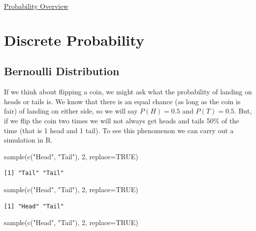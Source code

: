\documentclass[
  letterpaper,
  DIV=11,
  numbers=noendperiod]{scrreprt}
\newenvironment{Shaded}{\begin{snugshade}}{\end{snugshade}}
\newcommand{\AttributeTok}[1]{\textcolor[rgb]{0.40,0.45,0.13}{#1}}
\newcommand{\ConstantTok}[1]{\textcolor[rgb]{0.56,0.35,0.01}{#1}}
\newcommand{\DecValTok}[1]{\textcolor[rgb]{0.68,0.00,0.00}{#1}}
\newcommand{\FunctionTok}[1]{\textcolor[rgb]{0.28,0.35,0.67}{#1}}
\newcommand{\NormalTok}[1]{\textcolor[rgb]{0.00,0.23,0.31}{#1}}
\newcommand{\StringTok}[1]{\textcolor[rgb]{0.13,0.47,0.30}{#1}}
\begin{document}
\begin{watch}{}{}
    \href{https://youtu.be/BxHJLWyJWZo}{Probability Overview}
\end{watch}

\section{Discrete Probability}\label{discrete-probability}

\subsection{Bernoulli Distribution}\label{bernoulli-distribution}

If we think about flipping a coin, we might ask what the probability of
landing on heads or tails is. We know that there is an equal chance (as
long as the coin is fair) of landing on either side, so we will say
\(P(H)=0.5\) and \(P(T)=0.5\). But, if we flip the coin two times we
will not always get heads and tails 50\% of the time (that is 1 head and
1 tail). To see this phenomenon we can carry out a simulation in R.

\begin{Shaded}
\begin{Highlighting}[]
\FunctionTok{sample}\NormalTok{(}\FunctionTok{c}\NormalTok{(}\StringTok{"Head"}\NormalTok{, }\StringTok{"Tail"}\NormalTok{), }\DecValTok{2}\NormalTok{, }\AttributeTok{replace=}\ConstantTok{TRUE}\NormalTok{)}
\end{Highlighting}
\end{Shaded}

\begin{verbatim}
[1] "Tail" "Tail"
\end{verbatim}

\begin{Shaded}
\begin{Highlighting}[]
\FunctionTok{sample}\NormalTok{(}\FunctionTok{c}\NormalTok{(}\StringTok{"Head"}\NormalTok{, }\StringTok{"Tail"}\NormalTok{), }\DecValTok{2}\NormalTok{, }\AttributeTok{replace=}\ConstantTok{TRUE}\NormalTok{)}
\end{Highlighting}
\end{Shaded}

\begin{verbatim}
[1] "Head" "Tail"
\end{verbatim}

\begin{Shaded}
\begin{Highlighting}[]
\FunctionTok{sample}\NormalTok{(}\FunctionTok{c}\NormalTok{(}\StringTok{"Head"}\NormalTok{, }\StringTok{"Tail"}\NormalTok{), }\DecValTok{2}\NormalTok{, }\AttributeTok{replace=}\ConstantTok{TRUE}\NormalTok{)}
\end{Highlighting}
\end{Shaded}
\end{document}
